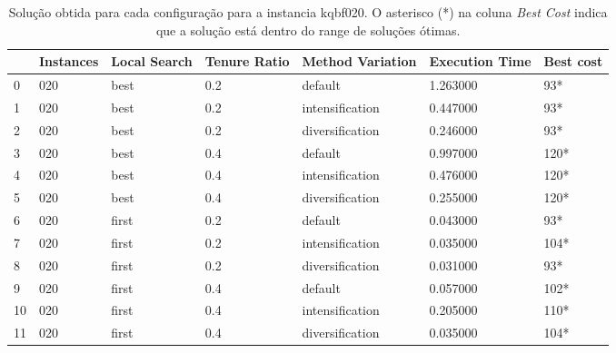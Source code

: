 
\begin{table}
\centering
\begin{tabular}{lllllll}
\toprule
{} & Instances & Local Search & Tenure Ratio & Method Variation & Execution Time & Best cost \\
\midrule
0  &       020 &         best &          0.2 &          default &     1.263000 &        93* \\
1  &       020 &         best &          0.2 &  intensification &     0.447000 &        93* \\
2  &       020 &         best &          0.2 &  diversification &     0.246000 &        93* \\
3  &       020 &         best &          0.4 &          default &     0.997000 &       120* \\
4  &       020 &         best &          0.4 &  intensification &     0.476000 &       120* \\
5  &       020 &         best &          0.4 &  diversification &     0.255000 &       120* \\
6  &       020 &        first &          0.2 &          default &     0.043000 &        93* \\
7  &       020 &        first &          0.2 &  intensification &     0.035000 &       104* \\
8  &       020 &        first &          0.2 &  diversification &     0.031000 &        93* \\
9  &       020 &        first &          0.4 &          default &     0.057000 &       102* \\
10 &       020 &        first &          0.4 &  intensification &     0.205000 &       110* \\
11 &       020 &        first &          0.4 &  diversification &     0.035000 &       104* \\
\bottomrule
\end{tabular}
\caption{Solução obtida para cada configuração para a instancia kqbf020. O asterisco (*) na coluna \textit{Best Cost} indica que a solução está dentro do range de soluções ótimas.}
\label{table:all-data-0}
\end{table}

